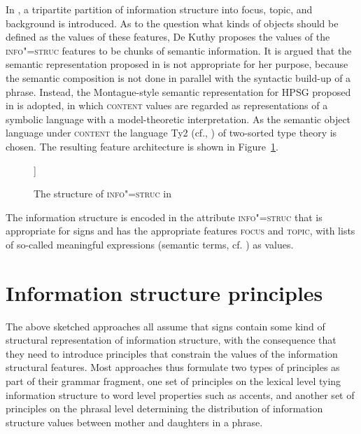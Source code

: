 \documentclass[output=paper]{langsci/langscibook}
\begin{document}
In \cite{deKuthy2002a}, a tripartite partition of information
structure into focus, topic, and background is introduced. As to the
question what kinds of objects should be defined as the values of
these features, De Kuthy proposes the values of the
\textsc{info"=struc} features to be chunks of semantic information.  It
is argued that the semantic representation proposed in \cite{ps2} is
not appropriate for her purpose, because the semantic composition is
not done in parallel with the syntactic build-up of a phrase. Instead,
the Montague-style semantic representation for HPSG proposed in
\cite{Sailer2000a} is adopted, in which \textsc{content} values are
regarded as representations of a symbolic language with a
model-theoretic interpretation. As the semantic object language under
\textsc{content} the language Ty2 (cf., \cite{Gallin75a-u}) of
two-sorted type theory is chosen. The resulting feature architecture
is shown in Figure~\ref{fig:info-struc}.

\begin{figure}[htb!]
  \begin{center}
\leavevmode
    \begin{avm}
     [\tp{sign}\\
      phon & list\\
      synsem & synsem\\
      info-struc &
      [\tp{info-struc}\\
        focus & list-of-mes\\
        topic & list-of-mes
      ] 
     ]
    \end{avm}
    \caption{The structure of \textsc{info"=struc} in \cite{deKuthy2002a}}
    \label{fig:info-struc}
  \end{center}
\end{figure}
The information structure is
encoded in the attribute \textsc{info"=struc} that is appropriate for
signs and has the appropriate features \textsc{focus} and
\textsc{topic}, with lists of so-called meaningful expressions
(semantic terms, cf.  \cite{Sailer2000a}) as values.

\section{Information structure principles}
\label{sec:inf-principles}

The above sketched approaches all assume that signs contain some kind
of structural representation of information structure, with the
consequence that they need to introduce principles that constrain the
values of the information structural features. Most approaches thus
formulate two types of principles as part of their grammar fragment,
one set of principles on the lexical level tying information structure to word
level properties such as accents, and another set of principles on the
phrasal level determining the distribution of information structure
values between mother and daughters in a phrase.
\end{document}
